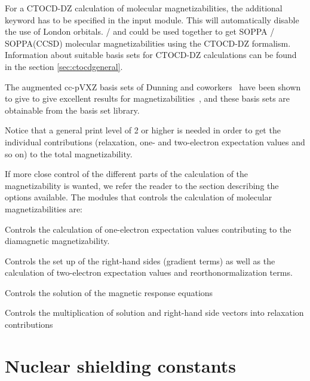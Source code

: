 For a CTOCD-DZ calculation of molecular magnetizabilities, the 
additional keyword  has to be specified in the  
input module. This will automatically disable the use of London orbitals.
 /  and  could be used together to get
SOPPA / SOPPA(CCSD) molecular magnetizabilities using the CTOCD-DZ
formalism. Information about suitable basis sets for CTOCD-DZ calculations can
be found in the section \ref{sec:ctocdgeneral}.  

The augmented cc-pVXZ basis sets of Dunning and
coworkers~\cite{thdjcp90,rakthdrjhjcp96,dewthdjcp98,dewthdjcp100} have
been shown to give  to give excellent results for
magnetizabilities~\cite{krthklbpjhjajjcp99,krthpjklbcpl223,krhsthklbpjjacs116},
and these basis sets are obtainable from the basis set library.

Notice that a general print level of 2 or higher is needed in order to
get the individual contributions (relaxation, one- and
two-electron expectation values and so on) to the total magnetizability.

If more close control of the different parts of the calculation of the
magnetizability is wanted, we refer the reader to the section
describing the options available. The modules that controls the
calculation of molecular magnetizabilities are:

\begin{list}{}{\itemsep 0.10cm \parsep 0.0cm}
\item[\Sec{EXPECT}] Controls the calculation of one-electron
expectation values contributing to the diamagnetic magnetizability.
\item[\Sec{GETSGY}] Controls the set up of the right-hand sides
(gradient terms) as well as the calculation of two-electron
expectation values and reorthonormalization terms.
\item[\Sec{LINRES}] Controls the solution of the magnetic response
equations
\item[\Sec{RELAX}] Controls the multiplication of solution and right-hand
side vectors into relaxation contributions
\end{list}

\section{Nuclear shielding constants}\label{sec:shieldings}

